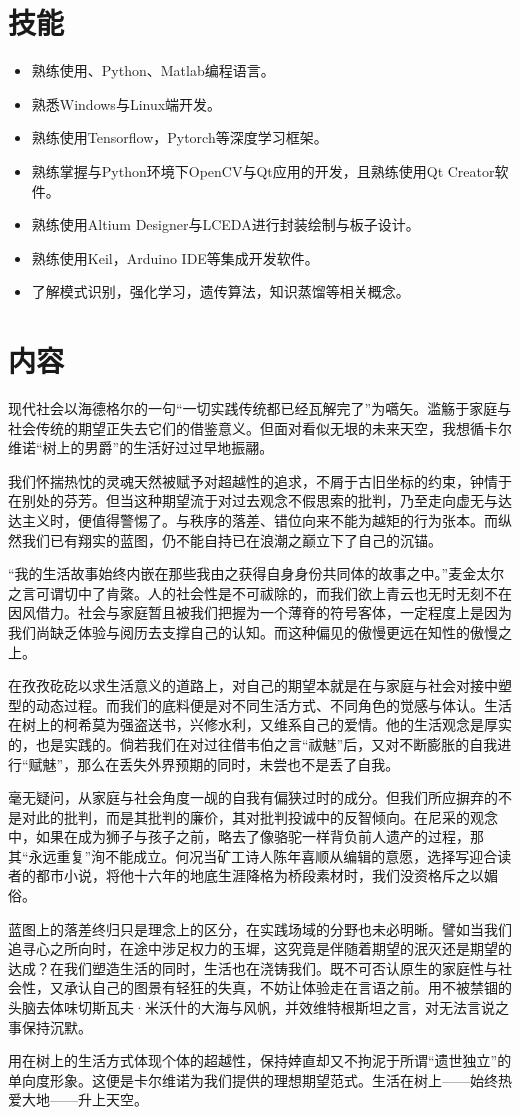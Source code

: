 \documentclass{cv}
\begin{document}
\section{技能}

\begin{itemize}
	\item 熟练使用\Cpp 、Python、Matlab编程语言。
	\item 熟悉Windows与Linux端开发。
	\item 熟练使用Tensorflow，Pytorch等深度学习框架。
	\item 熟练掌握\Cpp 与Python环境下OpenCV与Qt应用的开发，且熟练使用Qt Creator软件。
	\item 熟练使用Altium Designer与LCEDA进行封装绘制与板子设计。
	\item 熟练使用Keil，Arduino IDE等集成开发软件。
	\item 了解模式识别，强化学习，遗传算法，知识蒸馏等相关概念。
\end{itemize}

\section[\faTree]{内容}

现代社会以海德格尔的一句“一切实践传统都已经瓦解完了”为嚆矢。滥觞于家庭与社会传统的期望正失去它们的借鉴意义。但面对看似无垠的未来天空，我想循卡尔维诺“树上的男爵”的生活好过过早地振翮。

我们怀揣热忱的灵魂天然被赋予对超越性的追求，不屑于古旧坐标的约束，钟情于在别处的芬芳。但当这种期望流于对过去观念不假思索的批判，乃至走向虚无与达达主义时，便值得警惕了。与秩序的落差、错位向来不能为越矩的行为张本。而纵然我们已有翔实的蓝图，仍不能自持已在浪潮之巅立下了自己的沉锚。

“我的生活故事始终内嵌在那些我由之获得自身身份共同体的故事之中。”麦金太尔之言可谓切中了肯綮。人的社会性是不可祓除的，而我们欲上青云也无时无刻不在因风借力。社会与家庭暂且被我们把握为一个薄脊的符号客体，一定程度上是因为我们尚缺乏体验与阅历去支撑自己的认知。而这种偏见的傲慢更远在知性的傲慢之上。

在孜孜矻矻以求生活意义的道路上，对自己的期望本就是在与家庭与社会对接中塑型的动态过程。而我们的底料便是对不同生活方式、不同角色的觉感与体认。生活在树上的柯希莫为强盗送书，兴修水利，又维系自己的爱情。他的生活观念是厚实的，也是实践的。倘若我们在对过往借韦伯之言“祓魅”后，又对不断膨胀的自我进行“赋魅”，那么在丢失外界预期的同时，未尝也不是丢了自我。

毫无疑问，从家庭与社会角度一觇的自我有偏狭过时的成分。但我们所应摒弃的不是对此的批判，而是其批判的廉价，其对批判投诚中的反智倾向。在尼采的观念中，如果在成为狮子与孩子之前，略去了像骆驼一样背负前人遗产的过程，那其“永远重复”洵不能成立。何况当矿工诗人陈年喜顺从编辑的意愿，选择写迎合读者的都市小说，将他十六年的地底生涯降格为桥段素材时，我们没资格斥之以媚俗。

蓝图上的落差终归只是理念上的区分，在实践场域的分野也未必明晰。譬如当我们追寻心之所向时，在途中涉足权力的玉墀，这究竟是伴随着期望的泯灭还是期望的达成？在我们塑造生活的同时，生活也在浇铸我们。既不可否认原生的家庭性与社会性，又承认自己的图景有轻狂的失真，不妨让体验走在言语之前。用不被禁锢的头脑去体味切斯瓦夫·米沃什的大海与风帆，并效维特根斯坦之言，对无法言说之事保持沉默。

用在树上的生活方式体现个体的超越性，保持婞直却又不拘泥于所谓“遗世独立”的单向度形象。这便是卡尔维诺为我们提供的理想期望范式。生活在树上——始终热爱大地——升上天空。
\end{document}
